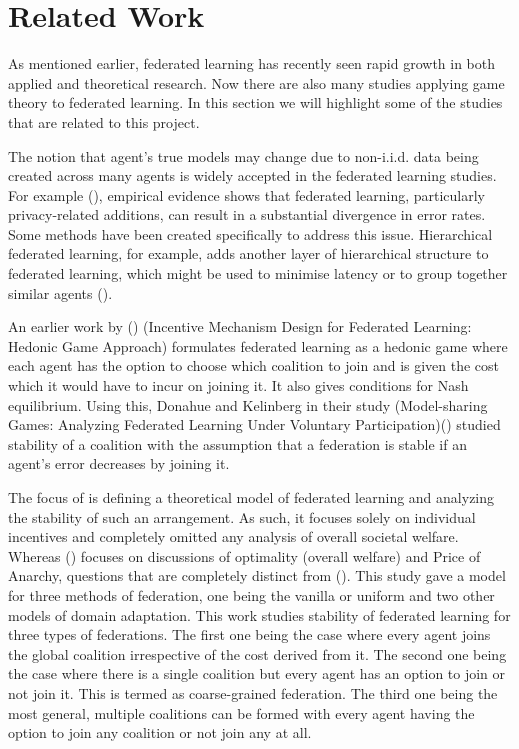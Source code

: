 \documentclass{article}
\begin{document}
\section{Related Work}

As mentioned earlier, federated learning has recently seen rapid growth in both applied and theoretical research. Now there are also many studies applying game theory to federated learning. In this section we will highlight some of the studies that are related to this project.

The notion that agent's true models may change due to non-i.i.d. data being created across many agents is widely accepted in the federated learning studies. For example (\cite{yu2020salvaging, bagdasaryan2019differential}), empirical evidence shows that federated learning, particularly privacy-related additions, can result in a substantial divergence in error rates. Some methods have been created specifically to address this issue. Hierarchical federated learning, for example, adds another layer of hierarchical structure to federated learning, which might be used to minimise latency or to group together similar agents (\cite{lin2018dont, Liu_2020}).

An earlier work by (\cite{hasan2021incentive}) (Incentive Mechanism Design for Federated Learning: Hedonic Game Approach) formulates federated learning as a hedonic game where each agent has the option to choose which coalition to join and is given the cost which it would have to incur on joining it. It also gives conditions for Nash equilibrium. Using this, Donahue and Kelinberg in their study (Model-sharing Games: Analyzing Federated Learning Under Voluntary Participation)(\cite{donahue2020model}) studied stability of a coalition with the assumption that a federation is stable if an agent's error decreases by joining it.

The focus of \cite{donahue2020model} is defining a theoretical model of federated learning and analyzing the stability of such an arrangement. As such, it focuses solely on individual incentives and completely omitted any analysis of overall societal welfare. Whereas (\cite{donahue2021opt}) focuses on discussions of optimality (overall welfare) and Price of Anarchy, questions that are completely distinct from (\cite{donahue2020model}). This study gave a model for three methods of federation, one being the vanilla or uniform and two other models of domain adaptation. This work studies stability of federated learning for three types of federations. The first one being the case where every agent joins the global coalition irrespective of the cost derived from it. The second one being the case where there is a single coalition but every agent has an option to join or not join it. This is termed as coarse-grained federation. The third one being the most general, multiple coalitions can be formed with every agent having the option to join any coalition or not join any at all.
\end{document}
